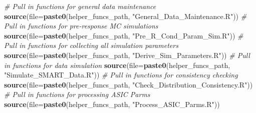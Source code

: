 \documentclass[
]{article}
\newenvironment{Shaded}{\begin{snugshade}}{\end{snugshade}}
\newcommand{\AttributeTok}[1]{\textcolor[rgb]{0.13,0.29,0.53}{#1}}
\newcommand{\CommentTok}[1]{\textcolor[rgb]{0.56,0.35,0.01}{\textit{#1}}}
\newcommand{\FunctionTok}[1]{\textcolor[rgb]{0.13,0.29,0.53}{\textbf{#1}}}
\newcommand{\NormalTok}[1]{#1}
\newcommand{\OtherTok}[1]{\textcolor[rgb]{0.56,0.35,0.01}{#1}}
\newcommand{\SpecialCharTok}[1]{\textcolor[rgb]{0.81,0.36,0.00}{\textbf{#1}}}
\newcommand{\StringTok}[1]{\textcolor[rgb]{0.31,0.60,0.02}{#1}}
\begin{document}
\begin{Shaded}
\begin{Highlighting}[]
\CommentTok{\# Pull in functions for general data maintenance}
\FunctionTok{source}\NormalTok{(}\AttributeTok{file=}\FunctionTok{paste0}\NormalTok{(helper\_funcs\_path, }\StringTok{"General\_Data\_Maintenance.R"}\NormalTok{))}
\CommentTok{\# Pull in functions for pre{-}response MC simulations}
\FunctionTok{source}\NormalTok{(}\AttributeTok{file=}\FunctionTok{paste0}\NormalTok{(helper\_funcs\_path, }\StringTok{"Pre\_R\_Cond\_Param\_Sim.R"}\NormalTok{))}
\CommentTok{\# Pull in functions for collecting all simulation parameters}
\FunctionTok{source}\NormalTok{(}\AttributeTok{file=}\FunctionTok{paste0}\NormalTok{(helper\_funcs\_path, }\StringTok{"Derive\_Sim\_Parameters.R"}\NormalTok{))}
\CommentTok{\# Pull in functions for data simulation}
\FunctionTok{source}\NormalTok{(}\AttributeTok{file=}\FunctionTok{paste0}\NormalTok{(helper\_funcs\_path, }\StringTok{"Simulate\_SMART\_Data.R"}\NormalTok{))}
\CommentTok{\# Pull in functions for consistency checking}
\FunctionTok{source}\NormalTok{(}\AttributeTok{file=}\FunctionTok{paste0}\NormalTok{(helper\_funcs\_path, }\StringTok{"Check\_Distribution\_Consistency.R"}\NormalTok{))}
\CommentTok{\# Pull in functions for processing ASIC Parms}
\FunctionTok{source}\NormalTok{(}\AttributeTok{file=}\FunctionTok{paste0}\NormalTok{(helper\_funcs\_path, }\StringTok{"Process\_ASIC\_Parms.R"}\NormalTok{))}
\end{Highlighting}
\end{Shaded}

\begin{Shaded}
\end{Shaded}
\end{document}
